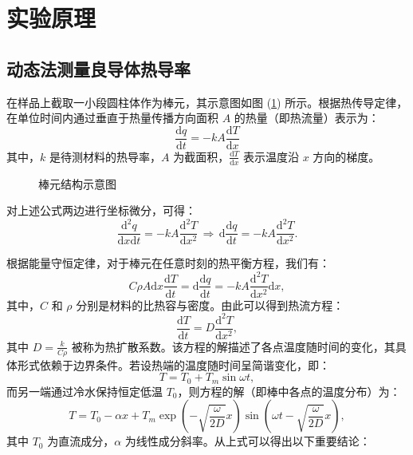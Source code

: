 \documentclass[UTF-8,twoside,cs4size]{ctexart}
\newcommand{\dif}{\mathrm{d}}
\begin{document}
\section{实验原理}
\subsection{动态法测量良导体热导率}
在样品上截取一小段圆柱体作为棒元，其示意图如图 (\ref{difx}) 所示。根据热传导定律，在单位时间内通过垂直于热量传播方向面积 $A$ 的热量（即热流量）表示为：
\[
\frac{\dif q}{\dif t} = -kA\frac{\dif T}{\dif x}
\]
其中，$k$ 是待测材料的热导率，$A$ 为截面积，$\frac{\dif T}{\dif x}$ 表示温度沿 $x$ 方向的梯度。

\begin{figure}[!h]
    \centering
    \caption{棒元结构示意图}
    \label{difx}
\end{figure}

对上述公式两边进行坐标微分，可得：
\[
\frac{\dif^2 q}{\dif x\dif t} = -kA \frac{\dif^2 T}{\dif x^2}\,\Longrightarrow\,\dif\frac{\dif q}{\dif t} = -kA\frac{\dif^2 T}{\dif x^2}.
\]

根据能量守恒定律，对于棒元在任意时刻的热平衡方程，我们有：
\[
C\rho A\dif x\frac{\dif T}{\dif t} = \dif\frac{\dif q}{\dif t} = -kA \frac{\dif^2 T}{\dif x^2} \dif x,
\]
其中，$C$ 和 $\rho$ 分别是材料的比热容与密度。由此可以得到热流方程：
\[
\frac{\dif T}{\dif t} = D \frac{\dif^2 T}{\dif x^2},
\]
其中 $D = \frac{k}{C\rho}$ 被称为热扩散系数。该方程的解描述了各点温度随时间的变化，其具体形式依赖于边界条件。若设热端的温度随时间呈简谐变化，即：
\[
T = T_0 + T_m\sin\omega t,
\]
而另一端通过冷水保持恒定低温 $T_0$，则方程的解（即棒中各点的温度分布）为：
\[
T = T_0 - \alpha x + T_m\exp\left(-\sqrt{\frac{\omega}{2D}}x\right)\sin\left(\omega t - \sqrt{\frac{\omega}{2D}}x\right),
\]
其中 $T_0$ 为直流成分，$\alpha$ 为线性成分斜率。从上式可以得出以下重要结论：
\end{document}
